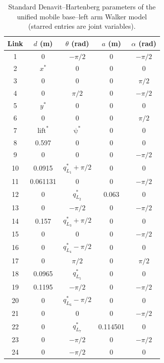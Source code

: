 \begin{table}[H]
    \centering
    \small
    \begin{tabular}{ccccc}
        \toprule
        Link & $d$ (m) & $\theta$ (rad) & $a$ (m) & $\alpha$ (rad) \\
        \midrule
        1  & 0 & $-\pi/2$ & 0 & $-\pi/2$ \\
        2  & $x^*$ & 0 & 0 & 0 \\
        3  & 0 & 0 & 0 & $\pi/2$ \\
        4  & 0 & $\pi/2$ & 0 & $-\pi/2$ \\
        5  & $y^*$ & 0 & 0 & 0 \\
        6  & 0 & 0 & 0 & $\pi/2$ \\
        7  & $\mathrm{lift}^*$ & $\mathrm{\psi }^*$ & 0 & 0 \\
        8  & 0.597 & 0 & 0 & 0 \\
        9  & 0 & 0 & 0 & $-\pi/2$ \\
        10 & 0.0915 & $q_{L_1}^*+\pi/2$ & 0 & 0 \\
        11 & 0.061131 & 0 & 0 & $-\pi/2$ \\
        12 & 0 & $q_{L_2}^*$ & 0.063 & 0 \\
        13 & 0 & $-\pi/2$ & 0 & $-\pi/2$ \\
        14 & 0.157 & $q_{L_3}^*+\pi/2$ & 0 & 0 \\
        15 & 0 & 0 & 0 & $-\pi/2$ \\
        16 & 0 & $q_{L_4}^*-\pi/2$ & 0 & 0 \\
        17 & 0 & $\pi/2$ & 0 & $\pi/2$ \\
        18 & 0.0965 & $q_{L_5}^*$ & 0 & 0 \\
        19 & 0.1195 & $-\pi/2$ & 0 & $-\pi/2$ \\
        20 & 0 & $q_{L_6}^*-\pi/2$ & 0 & 0 \\
        21 & 0 & 0 & 0 & $-\pi/2$ \\
        22 & 0 & $q_{L_7}^*$ & 0.114501 & 0 \\
        23 & 0 & $-\pi/2$ & 0 & $-\pi/2$ \\
        24 & 0 & $-\pi/2$ & 0 & 0 \\
        \bottomrule
    \end{tabular}
    \caption{\small{Standard Denavit--Hartenberg parameters of the unified mobile base--left arm Walker model (starred entries are joint variables).}}
    \label{tab:app_dh}
\end{table}

